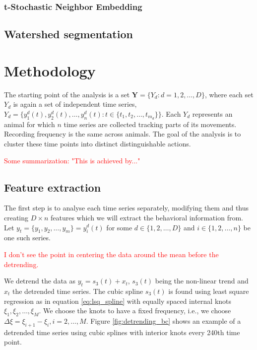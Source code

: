 \documentclass[a4paper]{memoir}
\theoremstyle{plain}
\theoremstyle{definition}
\theoremstyle{remark}
\begin{document}
\subsection{t-Stochastic Neighbor Embedding}
\section{Watershed segmentation}




\chapter{Methodology}
The starting point of the analysis is a set $\textbf{Y} =  \{ Y_d : d = 1, 2, \hdots, D \}$, where each set $Y_d$ is again a set of independent time series, $Y_d = \{ y_1^d(t), y_2^d(t), \hdots, y_n^d(t): t \in \{t_1, t_2, \hdots, t_{m_d} \} \}$.
Each $Y_d$ represents an animal for which $n$ time series are collected tracking parts of its movements.
Recording frequency is the same across animals.
The goal of the analysis is to cluster these time points into distinct distinguishable actions.

\textcolor{red}{Some summarization: "This is achieved by..."}

\section{Feature extraction}
The first step is to analyse each time series separately, modifying them and thus creating $D \times n$ features which we will extract the behavioral information from.
Let $y_t = \{ y_1, y_2, \hdots, y_m \} = y_i^d(t)$ for some $d \in \{ 1, 2, \hdots, D \}$ and $i \in \{ 1, 2, \hdots, n \}$ be one such series.

\textcolor{red}{I don't see the point in centering the data around the mean before the detrending.}

We detrend the data as $y_t = s_3(t) + x_t$, $s_3(t)$ being the non-linear trend and $x_t$ the detrended time series.
The cubic spline $s_3(t)$ is found using least square regression as in equation \eqref{eq:lsq_spline} with equally spaced internal knots $\xi_1, \xi_2, \hdots, \xi_M$.
We choose the knots to have a fixed frequency, i.e., we choose $\Delta \xi= \xi_{i+1} - \xi_i, i = 2, \hdots, M$.
Figure \ref{fig:detrending_bc} shows an example of a detrended time series using cubic splines with interior knots every 240th time point.
\end{document}
